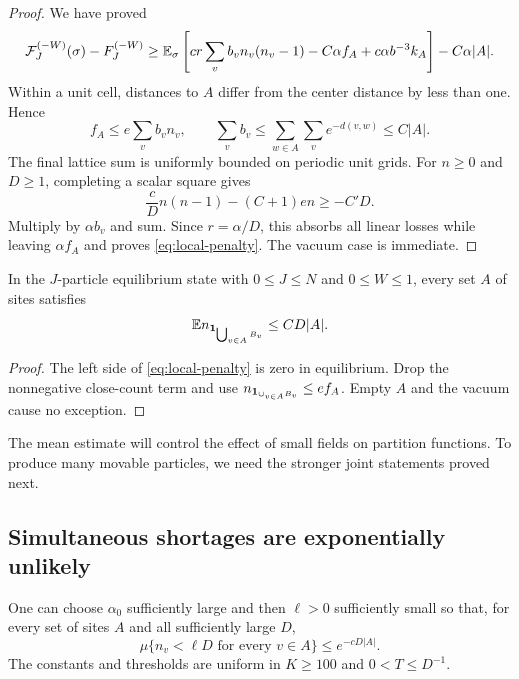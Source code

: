 \begin{proof}
We have proved
\[
 \mathcal F_J^{(-W)}(\sigma)-F_J^{(-W)}
 \ge\mathbb E_\sigma\left[cr\sum_vb_vn_v(n_v-1)
       -C\alpha f_A+c\alpha b^{-3}k_A\right]-C\alpha|A|.
\]
Within a unit cell, distances to $A$ differ from the center distance
by less than one. Hence
\[
 f_A\le e\sum_v b_vn_v,\qquad
 \sum_v b_v\le\sum_{w\in A}\sum_v e^{-d(v,w)}\le C|A|.
\]
The final lattice sum is uniformly bounded on periodic unit grids.
For $n\ge0$ and $D\ge1$, completing a scalar square gives
\[
 \frac cD n(n-1)-(C+1)e n\ge-C'D.
\]
Multiply by $\alpha b_v$ and sum. Since $r=\alpha/D$, this
absorbs all linear losses while leaving $\alpha f_A$ and proves
\eqref{eq:local-penalty}. The vacuum case is immediate.
\end{proof}

\begin{corollary}\label{cor:field-density}
In the $J$-particle equilibrium state with $0\le J\le N$ and
$0\le W\le1$, every set $A$ of sites satisfies
\begin{equation}\label{eq:field-density}
 \mathbb E n_{\mathbf 1_{\bigcup_{v\in A}B_v}}\le CD|A|.
\end{equation}
\end{corollary}

\begin{proof}
The left side of \eqref{eq:local-penalty} is zero in equilibrium.
Drop the nonnegative close-count term and use
$n_{\mathbf 1_{\cup_{v\in A}B_v}}\le e f_A$. Empty $A$ and the
vacuum cause no exception.
\end{proof}

The mean estimate will control the effect of small fields on partition
functions. To produce many movable particles, we need the stronger joint
statements proved next.

\subsection{Simultaneous shortages are exponentially unlikely}

\begin{proposition}\label{prop:low-count}
One can choose $\alpha_0$ sufficiently large and then $\ell>0$
sufficiently small so that, for every set of sites $A$ and all
sufficiently large $D$,
\begin{equation}\label{eq:low-count}
 \mu\{n_v<\ell D\text{ for every }v\in A\}
 \le e^{-cD|A|}.
\end{equation}
The constants and thresholds are uniform in $K\ge100$ and
$0<T\le D^{-1}$.
\end{proposition}

